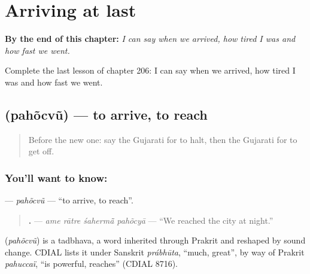 
\chapter{Arriving at last}
\label{ch:gu-arriving-at-last}

\begin{chapteropening}
\textbf{By the end of this chapter:} \emph{I can say when we arrived, how tired I was and how fast we went.}

Complete the last lesson of chapter 206: I can say when we arrived, how tired I was and how fast we went.
\end{chapteropening}

\section[\texorpdfstring{\gu{પહોંચવું} (pahõcvũ)}{પહોંચવું (pahõcvũ)}]{ (pahõcvũ) — to arrive, to reach}

\label{lesson:GU-C206-pahocvu}



\begin{quote}
Before the new one: say the Gujarati for to halt, then the Gujarati for to get off.
\end{quote}

\subsection*{You'll want to know: }
\textbf{} — \emph{pahõcvũ} — \textquotedblleft{}to arrive, to reach\textquotedblright{}.

\begin{quote}
\textbf{   .} — \emph{ame rātre śahermā̃ pahõcyā} — \textquotedblleft{}We reached the city at night.\textquotedblright{}
\end{quote}

\begin{cousinweb}
\textbf{} (\emph{pahõcvũ}) is a tadbhava, a word inherited through Prakrit and reshaped by sound change. CDIAL lists it under Sanskrit \emph{prábhūta}, \textquotedblleft{}much, great\textquotedblright{}, by way of Prakrit \emph{pahuccaï}, \textquotedblleft{}is powerful, reaches\textquotedblright{} (CDIAL 8716).
\end{cousinweb}

